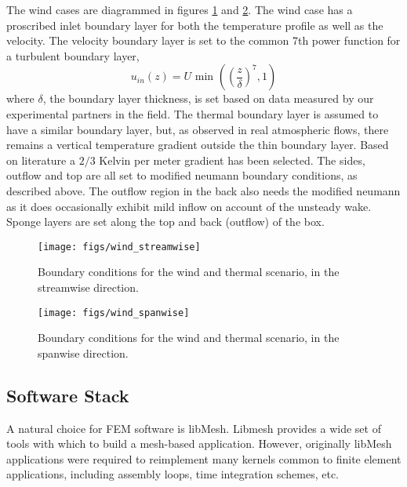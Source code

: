 The wind cases are diagrammed in figures \ref{fig:windstream} and
\ref{fig:windspan}. The wind case has a proscribed inlet boundary layer
for both the temperature profile as well as the velocity. The velocity
boundary layer is set to the common 7th power function for a
turbulent boundary layer,  
\begin{equation*}
  u_{in}(z) = U \text{ min }\left(\left(\frac{z}{\delta}\right)^7,1\right)
\end{equation*}
where $\delta$, the boundary layer thickness, is set based on data
measured by our experimental partners in the field. 
The thermal boundary layer is assumed to have a similar boundary layer,
but, as observed in real atmospheric flows, there remains a vertical
temperature gradient outside the thin boundary layer. Based on
literature a $2/3$ Kelvin per meter gradient has been
selected\cite{Blocken2007238}. The sides, outflow and top are all set to
modified neumann boundary conditions, as described above. The outflow
region in the back also needs the modified neumann as it does
occasionally exhibit mild inflow on account of the unsteady wake. Sponge
layers are set along the top and back (outflow) of the box. 

%
%
\begin{figure}[!htb]
  \begin{center}
    \texttt{[image: figs/wind\_streamwise]}
    \caption{Boundary conditions for the wind and thermal scenario, in
   the streamwise direction.} 
    \label{fig:windstream}
  \end{center}
\end{figure}

\begin{figure}[!htb]
  \begin{center}
    \texttt{[image: figs/wind\_spanwise]}
    \caption{Boundary conditions for the wind and thermal scenario, in
   the spanwise direction. } 
    \label{fig:windspan}
  \end{center}
\end{figure}


\subsection{Software Stack}

A natural choice for FEM software is 
libMesh\cite{libMeshPaper}. Libmesh provides a wide set of tools with
which to build a mesh-based application. However, originally libMesh
applications were required to reimplement many kernels common to finite
element applications, including assembly loops, time integration
schemes, etc.  

